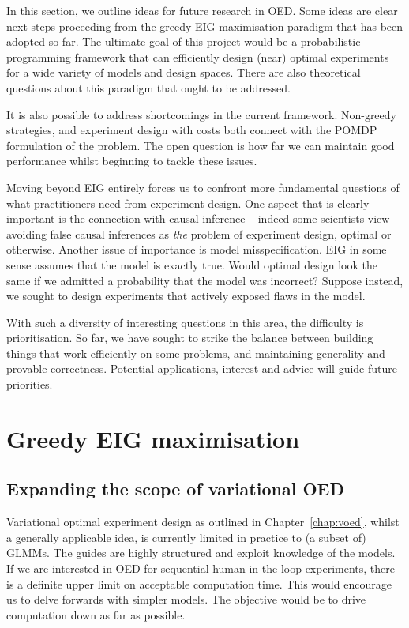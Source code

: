 In this section, we outline ideas for future research in OED. Some ideas are clear next steps proceeding from the greedy EIG maximisation paradigm that has been adopted so far. The ultimate goal of this project would be a probabilistic programming framework that can efficiently design (near) optimal experiments for a wide variety of models and design spaces. There are also theoretical questions about this paradigm that ought to be addressed.

It is also possible to address shortcomings in the current framework. Non-greedy strategies, and experiment design with costs both connect with the POMDP formulation of the problem. The open question is how far we can maintain good performance whilst beginning to tackle these issues.

Moving beyond EIG entirely forces us to confront more fundamental questions of what practitioners need from experiment design. One aspect that is clearly important is the connection with causal inference -- indeed some scientists view avoiding false causal inferences as \textit{the} problem of experiment design, optimal or otherwise. Another issue of importance is model misspecification. EIG in some sense assumes that the model is exactly true. Would optimal design look the same if we admitted a probability that the model was incorrect? Suppose instead, we sought to design experiments that actively exposed flaws in the model.

With such a diversity of interesting questions in this area, the difficulty is prioritisation. So far, we have sought to strike the balance between building things that work efficiently on some problems, and maintaining generality and provable correctness. Potential applications, interest and advice will guide future priorities.


\section{Greedy EIG maximisation}
\subsection{Expanding the scope of variational OED}
Variational optimal experiment design as outlined in Chapter~\ref{chap:voed}, whilst a generally applicable idea, is currently limited in practice to (a subset of) GLMMs. The guides are highly structured and exploit knowledge of the models. If we are interested in OED for sequential human-in-the-loop experiments, there is a definite upper limit on acceptable computation time. This would encourage us to delve forwards with simpler models. The objective would be to drive computation down as far as possible.

